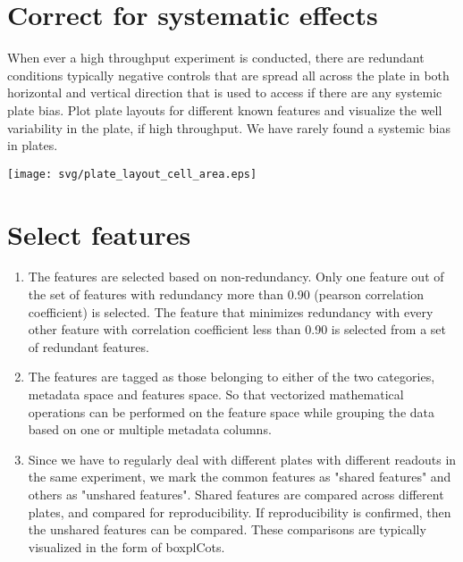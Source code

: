\documentclass[12pt]{article}
\begin{document}
\section{Correct for systematic effects}
	When ever a high throughput experiment is conducted, there are redundant conditions typically negative controls that are spread all across the plate in both horizontal and vertical direction that is used to access if there are any systemic plate bias. 
	Plot plate layouts for different known features and visualize the well variability in the plate, if high throughput. We have rarely found a systemic bias in plates. 
	\begin{center} \texttt{[image: svg/plate\_layout\_cell\_area.eps]} \end{center}	
	

\section{Select features}
	\begin{enumerate}
		\item The features are selected based on non-redundancy. Only one feature out of the set of features with redundancy more than 0.90 (pearson correlation coefficient) is selected. The feature that minimizes redundancy with every other feature with correlation coefficient less than 0.90 is selected from a set of redundant features.
		\item The features are tagged as those belonging to either of the two categories, metadata space and features space. So that vectorized mathematical operations can be performed on the feature space while grouping the data based on one or multiple metadata columns.
		\item Since we have to regularly deal with different plates with different readouts in the same experiment, we mark the common features as "shared features" and others as "unshared features". Shared features are compared across different plates, and compared for reproducibility. If reproducibility is confirmed, then the unshared features can be compared. These comparisons are typically visualized in the form of boxplCots.
	\end{enumerate}
	
\end{document}
